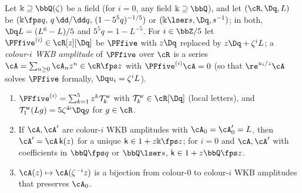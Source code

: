 \begin{lem}
\label{lem:gau-wkb}
Let $\Bbbk\supseteq\bbQ(\zeta)$ be a field (for $i=0$, any field $\Bbbk\supseteq\bbQ$), and let $(\cR,\Dq,L)$ be $(\Bbbk\fps q,\,q\,\dd/\dd q,\,(1-5^5q)^{-1/5})$ or $(\Bbbk\lser s,\Dq,s^{-1})$; in both, $\Dq L=(L^6-L)/5$ and $5^5q=1-L^{-5}$. For $i\in\bbZ/5$ let $\PFfive^{(i)}\in\cR[z][\Dq]$ be $\PFfive$ with $z\Dq$ replaced by $z\Dq+\zeta^iL$; a \emph{colour-$i$ WKB amplitude} of $\PFfive$ over $\cR$ is a series $\cA=\sum_{n\geq0}\cA_nz^n\in\cR\fps z$ with $\PFfive^{(i)}\cA=0$ (so that $\re^{u_i/z}\cA$ solves $\PFfive$ formally, $\Dq u_i=\zeta^iL$).
\begin{enumerate}
\item $\PFfive^{(i)}=\sum_{k=1}^5z^k\mathcal T^{\mathrm w}_k$ with $\mathcal T^{\mathrm w}_k\in\cR[\Dq]$ (local letters), and $\mathcal T^{\mathrm w}_1(Lg)=5\zeta^{4i}\Dq g$ for $g\in\cR$.
\item If $\cA,\cA'$ are colour-$i$ WKB amplitudes with $\cA_0=\cA'_0=L$, then $\cA'=\cA\,\mathsf k(z)$ for a unique $\mathsf k\in1+z\Bbbk\fps z$; for $i=0$ and $\cA,\cA'$ with coefficients in $\bbQ\fps q$ or $\bbQ\lser s$, $\mathsf k\in1+z\bbQ\fps z$.
\item $\cA(z)\mapsto\cA(\zeta^{-i}z)$ is a bijection from colour-$0$ to colour-$i$ WKB amplitudes that preserves $\cA_0$.
\end{enumerate}
\end{lem}

